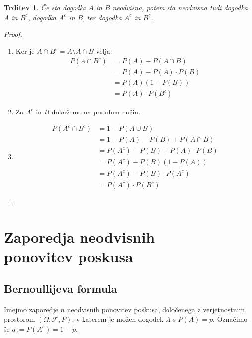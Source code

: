 \documentclass[12pt]{book}
\def\n{\noindent}
\theoremstyle{definition}
\theoremstyle{plain}
\theoremstyle{plain}
\newtheorem{trditev}{Trditev}
\theoremstyle{plain}
\theoremstyle{remark}
\begin{document}
\begin{trditev}
    Če sta dogodka $A$ in $B$ neodvisna, potem sta neodvisna tudi dogodka $A$ in $B^c$, dogodka $A^c$ in $B$, ter dogodka $A^c$ in $B^c$.
\end{trditev}

\begin{proof}
    ~

    \begin{enumerate}[label=(\roman*)]
        \item Ker je $A \cap B^c = A \setminus A \cap B$ velja: 
        $$
        \begin{aligned}
            P\left(A \cap B^c\right)&=P(A)-P(A \cap B) \\
            &=P(A)-P(A) \cdot P(B) \\
            &=P(A) (1-P(B)) \\
            &=P(A) \cdot P\left(B^c\right)
        \end{aligned}
        $$
        \item Za $A^c$ in $B$ dokažemo na podoben način.
        \item 
        $$
        \begin{aligned}
            P\left(A^c \cap B^c\right)&=1-P(A \cup B) \\
            &= 1-P(A)-P(B)+P(A \cap B) \\
            &= P\left(A^c\right)-P(B)+P(A) \cdot P(B) \\
            &= P\left(A^c\right)-P(B)(1-P(A)) \\
            &= P\left(A^c\right)-P(B) \cdot P\left(A^c\right) \\
            &= P\left(A^c\right) \cdot P\left(B^c\right)
        \end{aligned}
        $$
    \end{enumerate} 
\end{proof}

\chapter[Zaporedja neodvisnih ponovitev poskusa]{Zaporedja neodvisnih\\ponovitev poskusa}

\section{Bernoullijeva formula}

\n Imejmo zaporedje $n$ neodvisnih ponovitev poskusa, določenega z verjetnostnim prostorom $(\Omega, \mathcal{F}, P)$, v katerem je možen dogodek $A$ s $P(A) = p$. Označimo še $q := P(A^c) = 1-p$. 
\end{document}
